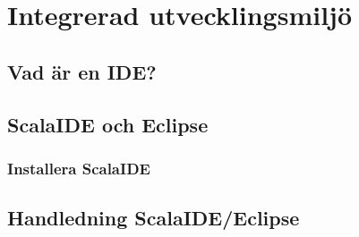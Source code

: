 
\chapter{Integrerad utvecklingsmiljö}

\section{Vad är en IDE?}

\section{ScalaIDE och Eclipse}

\subsection{Installera ScalaIDE}

\section{Handledning ScalaIDE/Eclipse}